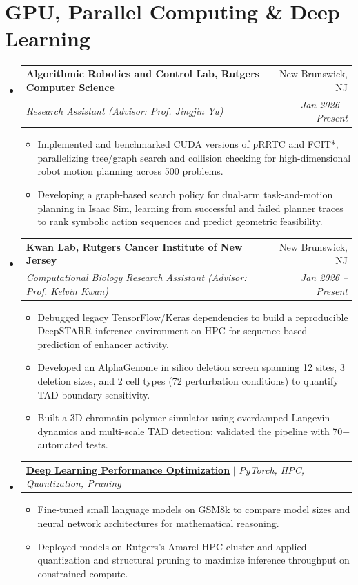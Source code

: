 \documentclass[letterpaper,11pt]{article}
\makeatletter
\newcommand{\resumeItem}[1]{
  \item\small{
    {#1 \vspace{-2pt}}
  }
}
\newcommand{\resumeSubheading}[4]{
  \vspace{-2pt}\item
    \begin{tabular*}{0.97\textwidth}[t]{l@{\extracolsep{\fill}}r}
      \textbf{#1} & #2 \\
      \textit{\small#3} & \textit{\small #4} \\
    \end{tabular*}\vspace{-7pt}
}
\newcommand{\resumeProjectHeading}[2]{
    \item
    \begin{tabular*}{0.97\textwidth}{l@{\extracolsep{\fill}}r}
      \small#1 & #2 \\
    \end{tabular*}\vspace{-7pt}
}
\newcommand{\resumeSubHeadingListStart}{\begin{itemize}[leftmargin=0.15in, label={}]}
\newcommand{\resumeSubHeadingListEnd}{\end{itemize}}
\newcommand{\resumeItemListStart}{\begin{itemize}}
\newcommand{\resumeItemListEnd}{\end{itemize}\vspace{-5pt}}
\makeatother
\begin{document}
\section{GPU, Parallel Computing \& Deep Learning}
  \resumeSubHeadingListStart
    \resumeSubheading
      {Algorithmic Robotics and Control Lab, Rutgers Computer Science}{New Brunswick, NJ}
      {Research Assistant (Advisor: Prof. Jingjin Yu)}{Jan 2026 -- Present}
      \resumeItemListStart
        \resumeItem{Implemented and benchmarked CUDA versions of pRRTC and FCIT*, parallelizing tree/graph search and collision checking for high-dimensional robot motion planning across 500 problems.}
        \resumeItem{Developing a graph-based search policy for dual-arm task-and-motion planning in Isaac Sim, learning from successful and failed planner traces to rank symbolic action sequences and predict geometric feasibility.}
      \resumeItemListEnd
    \resumeSubheading
      {Kwan Lab, Rutgers Cancer Institute of New Jersey}{New Brunswick, NJ}
      {Computational Biology Research Assistant (Advisor: Prof. Kelvin Kwan)}{Jan 2026 -- Present}
      \resumeItemListStart
        \resumeItem{Debugged legacy TensorFlow/Keras dependencies to build a reproducible DeepSTARR inference environment on HPC for sequence-based prediction of enhancer activity.}
        \resumeItem{Developed an AlphaGenome in silico deletion screen spanning 12 sites, 3 deletion sizes, and 2 cell types (72 perturbation conditions) to quantify TAD-boundary sensitivity.}
        \resumeItem{Built a 3D chromatin polymer simulator using overdamped Langevin dynamics and multi-scale TAD detection; validated the pipeline with 70+ automated tests.}
      \resumeItemListEnd
    \resumeProjectHeading
      {\href{https://github.com/AkeBoss-tech/llm-research}{\textbf{Deep Learning Performance Optimization}} $|$ \emph{PyTorch, HPC, Quantization, Pruning}}{}
      \resumeItemListStart
        \resumeItem{Fine-tuned small language models on GSM8k to compare model sizes and neural network architectures for mathematical reasoning.}
        \resumeItem{Deployed models on Rutgers's Amarel HPC cluster and applied quantization and structural pruning to maximize inference throughput on constrained compute.}
      \resumeItemListEnd
  \resumeSubHeadingListEnd
\end{document}
